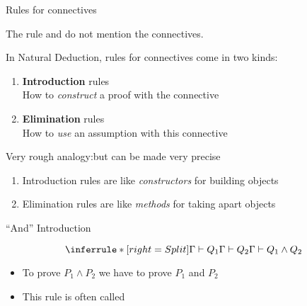 \documentclass[xetex,aspectratio=169,14pt,hyperref={pdfpagelabels=true,pdflang={en-GB}}]{beamer}
\begin{document}
\begin{frame}
  {Rules for connectives}

  \bigskip

  The rule  and  do not mention the connectives.

  \bigskip

  In Natural Deduction, rules for connectives come in two kinds:

  \bigskip

  \begin{enumerate}
  \item {\bf Introduction} rules\\
    \textcolor{black!60}{How to \emph{construct} a proof with the connective}
  \item {\bf Elimination} rules \\
    \textcolor{black!60}{How to \emph{use} an assumption with this connective}
  \end{enumerate}

  \bigskip
  \pause

  Very rough analogy:\quad \textcolor{black!60}{but can be made very precise}
  \begin{enumerate}
  \item Introduction rules are like \emph{constructors} for building objects
  \item Elimination rules are like \emph{methods} for taking apart objects
  \end{enumerate}
\end{frame}


\begin{frame}
  {``And'' Introduction}


  \begin{displaymath}
    \inferrule* [right=Split]
    {\Gamma \vdash Q_1 \\ \Gamma \vdash Q_2}
    {\Gamma \vdash Q_1 \land Q_2}
  \end{displaymath}

  \bigskip
  \pause

  \begin{itemize}
  \item To prove $P_1 \land P_2$ we have to prove $P_1$ and $P_2$
  \item This rule is often called 
  \end{itemize}
\end{frame}
\end{document}

